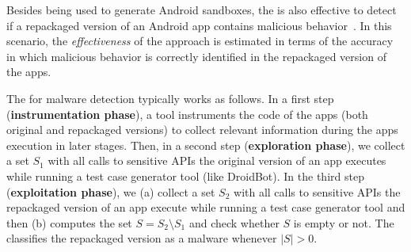 Besides being used to generate Android sandboxes, the \mas is also effective 
to detect if a repackaged version of an Android app contains malicious
behavior~\cite{DBLP:conf/wcre/BaoLL18}. In this scenario, the \emph{effectiveness} of the approach
is estimated in terms of the accuracy in which malicious behavior is correctly identified in the repackaged version of the
apps.


The \mas for malware detection typically works as follows. In a first step ({\bf instrumentation phase}), 
a tool instruments the code of the apps (both original and repackaged versions) to collect relevant information
during the apps execution in later stages. Then, in a second step ({\bf exploration phase}),
we collect a set $S_1$ with all calls to sensitive APIs the original version of an app executes while running a test case generator tool (like DroidBot).
In the third step ({\bf exploitation phase}), we (a) collect a set $S_2$ with all calls to sensitive APIs the repackaged version of an app
execute while running a test case generator tool and then (b) computes the set $S = S_2 \setminus S_1$ and check whether  $S$ is empty or not.
The \mas classifies the repackaged version as a malware whenever $|S| > 0$.  



